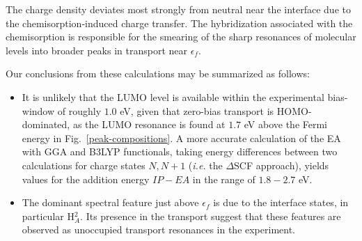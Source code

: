 \documentclass[aip,jcp,a4paper,reprint,floatfix,superscriptaddress]{revtex4-1}
\begin{document}
The charge density deviates most strongly from neutral near the interface due to the chemisorption-induced charge transfer. The hybridization associated with the chemisorption is responsible for the smearing of the sharp resonances of molecular levels into broader peaks in transport near $\epsilon_f$.

Our conclusions from these calculations may be summarized as follows:
\begin{itemize}
\item It is unlikely that the LUMO level is available within the experimental bias-window of roughly $1.0$ eV, given that zero-bias transport is HOMO-dominated, as the LUMO resonance is found at $1.7$ eV above the Fermi energy in Fig.~\ref{peak-compositions}. A more accurate calculation of the EA with GGA and B3LYP functionals, taking energy differences between two calculations for charge states $N,N+1$ (\emph{i.e.} the $\Delta$SCF approach), yields values for the addition energy $IP-EA$ in the range of $1.8-2.7$ eV.

\item The dominant spectral feature just above $\epsilon_f$ is due to the interface states, in particular H$^{2}_{A}$. Its presence in the transport suggest that these features are observed as unoccupied transport resonances in the experiment.

\end{itemize}
\end{document}

